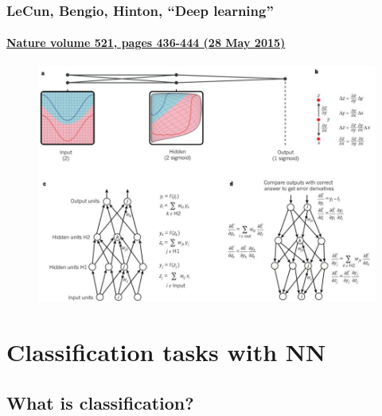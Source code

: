 \documentclass[hyperref={colorlinks=true}]{beamer}
\begin{document}
\begin{frame}[shrink=20]
  \frametitle{LeCun, Bengio, Hinton, ``Deep learning''}
  \framesubtitle{\href{https://www.nature.com/articles/nature14539\#f1}{Nature volume 521, pages 436-444 (28 May 2015)} }

  \vspace{-0.3cm}

  \begin{figure}
    \centering 
    \includegraphics[width=\textwidth]{BackPropagation-LeCun-Nature.jpg}
  \end{figure}
  
\end{frame}


\section[Classification tasks with NN]{Classification tasks with NN}

\subsection[What is classification?]{What is classification?}
\end{document}
